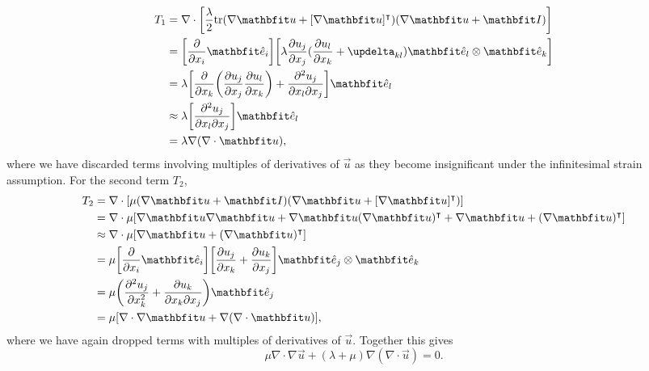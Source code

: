 \begin{align}
    T_1 &= \nabla \cdot \mleft[ \frac{\lambda}{2} \textrm{tr} ( \nabla \vec{u} + [\nabla \vec{u}]^{\intercal})(\nabla \vec{u} + \vec{I}) \mright] \nonumber\\
        &= \mleft[ \frac{\partial}{\partial x_{i}} \unitvec_{i} \mright] \mleft[ \lambda \frac{\partial u_j}{\partial x_{j}} (\frac{\partial u_{l}}{\partial x_{k}} + \updelta_{kl}) \unitvec_{l} \otimes \unitvec_{k} \mright] \nonumber\\
        &= \lambda \mleft[ \frac{\partial}{\partial x_{k}} \mleft( \frac{\partial u_{j}}{\partial x_{j}} \frac{\partial u_{l}}{\partial x_{k}} \mright) + \frac{\partial^{2} u_{j}}{\partial x_{l} \partial x_{j}} \mright] \unitvec_{l} \nonumber\\
        &\approx \lambda \mleft[ \frac{\partial^{2} u_{j}}{\partial x_{l} \partial x_{j}} \mright] \unitvec_{l} \nonumber\\
        &= \lambda \nabla (\nabla \cdot \vec{u}),
\end{align}
where we have discarded terms involving multiples of derivatives of $\vec{u}$ as they become insignificant under the infinitesimal strain assumption.
For the second term $T_2$,
\begin{align}
    T_2 &= \nabla \cdot [ \mu ( \nabla \vec{u} + \vec{I})(\nabla \vec{u} + [\nabla \vec{u}]^{\intercal})] \nonumber\\
        &= \nabla \cdot \mu [\nabla \vec{u} \nabla \vec{u} + \nabla \vec{u} (\nabla \vec{u})^{\intercal} + \nabla \vec{u} + (\nabla \vec{u})^{\intercal}] \nonumber\\
        &\approx \nabla \cdot \mu [\nabla \vec{u} + (\nabla \vec{u})^{\intercal}] \nonumber\\
        &= \mu \mleft[ \frac{\partial}{\partial x_{i}} \unitvec_{i} \mright] \mleft[ \frac{\partial u_{j}}{\partial x_{k}} + \frac{\partial u_{k}}{\partial x_{j}} \mright] \unitvec_{j} \otimes \unitvec_{k} \nonumber\\
        &= \mu \mleft(\frac{\partial^{2} u_{j}}{\partial x_{k}^{2}} + \frac{\partial u_{k}}{\partial x_{k} \partial x_{j}} \mright) \unitvec_{j} \nonumber\\
        &= \mu [\nabla \cdot \nabla \vec{u} + \nabla (\nabla \cdot \vec{u})],
\end{align}
where we have again dropped terms with multiples of derivatives of $\vec{u}$.
Together this gives
\begin{equation}
    \mu \nabla \cdot \nabla \vec{u} + (\lambda + \mu) \nabla (\nabla \cdot \vec{u}) = 0.
\end{equation}


